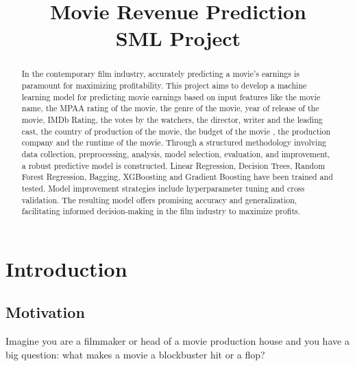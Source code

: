 \documentclass[conference]{IEEEtran}
\begin{document}
\title{Movie Revenue Prediction\\ SML Project}

\author{
     \vspace*{3.0pt}
    \and
     \vspace*{3.0pt}
}

\maketitle

\begin{abstract}
    In the contemporary film industry, accurately predicting a movie's earnings is paramount for maximizing profitability. This project aims to develop a machine learning model for predicting movie earnings based on input features like the movie name, the MPAA rating of the movie, the genre of the movie, year of release of the movie, IMDb Rating, the votes by the watchers, the director, writer and the leading cast, the country of production of the movie, the budget of the movie , the production company and the runtime of the movie. Through a structured methodology involving data collection, preprocessing, analysis, model selection, evaluation, and improvement, a robust predictive model is constructed. Linear Regression, Decision Trees, Random Forest Regression, Bagging, XGBoosting and Gradient Boosting have been trained and tested. Model improvement strategies include hyperparameter tuning and cross validation. The resulting model offers promising accuracy and generalization, facilitating informed decision-making in the film industry to maximize profits.
\end{abstract}

\IEEEpeerreviewmaketitle

\section{Introduction}
    \subsection{Motivation}
        Imagine you are a filmmaker or head of a movie production house and you have a big question: what makes a movie a blockbuster hit or a flop?
\end{document}
